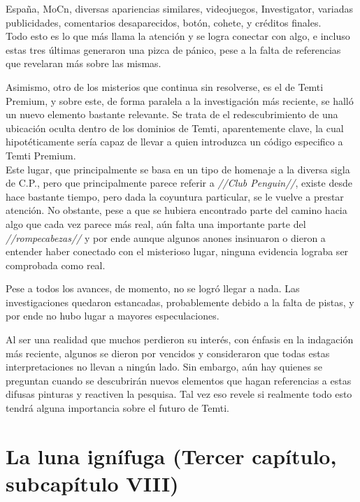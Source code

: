 \documentclass[
  spanish,
]{book}
\begin{document}
España, MoCn, diversas apariencias similares, videojuegos, Investigator, variadas publicidades, comentarios desaparecidos, botón, cohete, y créditos finales.\\
Todo esto es lo que más llama la atención y se logra conectar con algo, e incluso estas tres últimas generaron una pizca de pánico, pese a la falta de referencias que revelaran más sobre las mismas.

Asimismo, otro de los misterios que continua sin resolverse, es el de Temti Premium, y sobre este, de forma paralela a la investigación más reciente, se halló un nuevo elemento bastante relevante. Se trata de el redescubrimiento de una ubicación oculta dentro de los dominios de Temti, aparentemente clave, la cual hipotéticamente sería capaz de llevar a quien introduzca un código especifico a Temti Premium.\\
Este lugar, que principalmente se basa en un tipo de homenaje a la diversa sigla de C.P., pero que principalmente parece referir a \emph{//Club Penguin//}, existe desde hace bastante tiempo, pero dada la coyuntura particular, se le vuelve a prestar atención. No obstante, pese a que se hubiera encontrado parte del camino hacia algo que cada vez parece más real, aún falta una importante parte del \emph{//rompecabezas//} y por ende aunque algunos anones insinuaron o dieron a entender haber conectado con el misterioso lugar, ninguna evidencia lograba ser comprobada como real.

Pese a todos los avances, de momento, no se logró llegar a nada. Las investigaciones quedaron estancadas, probablemente debido a la falta de pistas, y por ende no hubo lugar a mayores especulaciones.

Al ser una realidad que muchos perdieron su interés, con énfasis en la indagación más reciente, algunos se dieron por vencidos y consideraron que todas estas interpretaciones no llevan a ningún lado. Sin embargo, aún hay quienes se preguntan cuando se descubrirán nuevos elementos que hagan referencias a estas difusas pinturas y reactiven la pesquisa. Tal vez eso revele si realmente todo esto tendrá alguna importancia sobre el futuro de Temti.

\hypertarget{la-luna-ignuxedfuga-tercer-capuxedtulo-subcapuxedtulo-viii}{%
\section{La luna ignífuga (Tercer capítulo, subcapítulo VIII)}\label{la-luna-ignuxedfuga-tercer-capuxedtulo-subcapuxedtulo-viii}}
\end{document}
